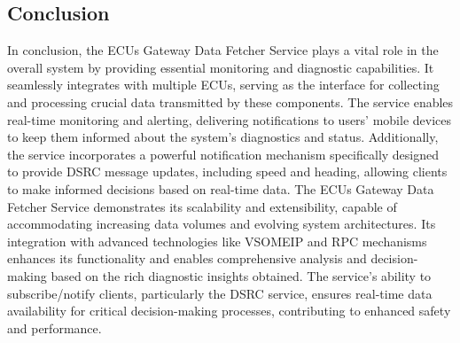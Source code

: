 \documentclass[
12pt,
oneside, 
onehalfspacing, 
nolistspacing, 
parskip, 
chapterinoneline, 
]{AASTCOMPUTER}
\begin{document}
\subsection{Conclusion}
In conclusion, the ECUs Gateway Data Fetcher Service plays a vital role in the overall system by providing essential monitoring and diagnostic capabilities. It seamlessly integrates with multiple ECUs, serving as the interface for collecting and processing crucial data transmitted by these components. The service enables real-time monitoring and alerting, delivering notifications to users' mobile devices to keep them informed about the system's diagnostics and status. Additionally, the service incorporates a powerful notification mechanism specifically designed to provide DSRC message updates, including speed and heading, allowing clients to make informed decisions based on real-time data.
The ECUs Gateway Data Fetcher Service demonstrates its scalability and extensibility, capable of accommodating increasing data volumes and evolving system architectures. Its integration with advanced technologies like VSOMEIP and RPC mechanisms enhances its functionality and enables comprehensive analysis and decision-making based on the rich diagnostic insights obtained. The service's ability to subscribe/notify clients, particularly the DSRC service, ensures real-time data availability for critical decision-making processes, contributing to enhanced safety and performance.
\end{document}

